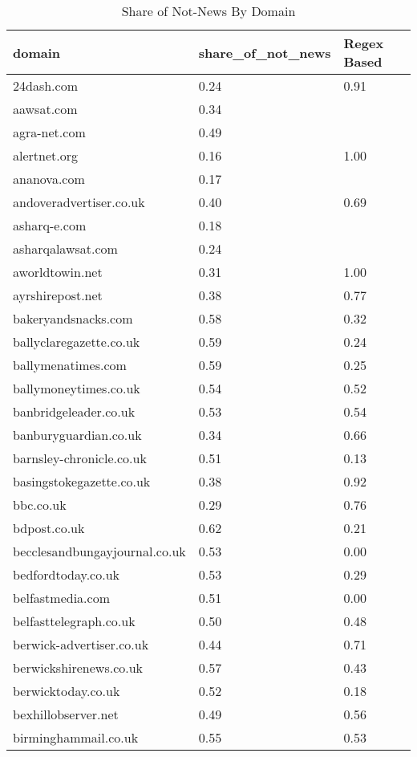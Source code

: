 \begingroup\tiny
\begin{longtable}{p{}p{}p{}}
\caption{Share of Not-News By Domain} \\ 
  \hline
domain & share_of_not_news & Regex Based \\ 
  \hline
24dash.com & 0.24 & 0.91 \\ 
  aawsat.com & 0.34 &  \\ 
  agra-net.com & 0.49 &  \\ 
  alertnet.org & 0.16 & 1.00 \\ 
  ananova.com & 0.17 &  \\ 
  andoveradvertiser.co.uk & 0.40 & 0.69 \\ 
  asharq-e.com & 0.18 &  \\ 
  asharqalawsat.com & 0.24 &  \\ 
  aworldtowin.net & 0.31 & 1.00 \\ 
  ayrshirepost.net & 0.38 & 0.77 \\ 
  bakeryandsnacks.com & 0.58 & 0.32 \\ 
  ballyclaregazette.co.uk & 0.59 & 0.24 \\ 
  ballymenatimes.com & 0.59 & 0.25 \\ 
  ballymoneytimes.co.uk & 0.54 & 0.52 \\ 
  banbridgeleader.co.uk & 0.53 & 0.54 \\ 
  banburyguardian.co.uk & 0.34 & 0.66 \\ 
  barnsley-chronicle.co.uk & 0.51 & 0.13 \\ 
  basingstokegazette.co.uk & 0.38 & 0.92 \\ 
  bbc.co.uk & 0.29 & 0.76 \\ 
  bdpost.co.uk & 0.62 & 0.21 \\ 
  becclesandbungayjournal.co.uk & 0.53 & 0.00 \\ 
  bedfordtoday.co.uk & 0.53 & 0.29 \\ 
  belfastmedia.com & 0.51 & 0.00 \\ 
  belfasttelegraph.co.uk & 0.50 & 0.48 \\ 
  berwick-advertiser.co.uk & 0.44 & 0.71 \\ 
  berwickshirenews.co.uk & 0.57 & 0.43 \\ 
  berwicktoday.co.uk & 0.52 & 0.18 \\ 
  bexhillobserver.net & 0.49 & 0.56 \\ 
  birminghammail.co.uk & 0.55 & 0.53 \\ 

\end{longtable}
